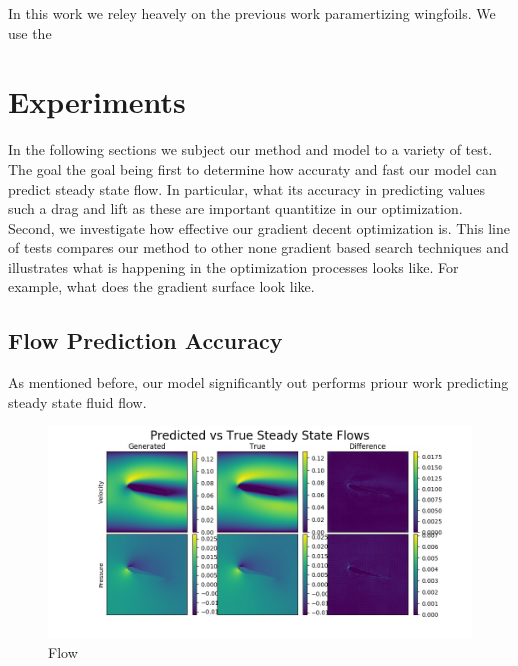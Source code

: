 \documentclass{article} %
\begin{document}
 In this work we reley heavely on the previous work paramertizing wingfoils. We use the 

\section{Experiments}

In the following sections we subject our method and model to a variety of test. The goal the goal being first to determine how accuraty and fast our model can predict steady state flow. In particular, what its accuracy in predicting values such a drag and lift as these are important quantitize in our optimization. Second, we investigate how effective our gradient decent optimization is. This line of tests compares our method to other none gradient based search techniques and illustrates what is happening in the optimization processes looks like. For example, what does the gradient surface look like.

\subsection{Flow Prediction Accuracy}

As mentioned before, our model significantly out performs priour work predicting steady state fluid flow. 

\begin{figure}[h]
\begin{center}
\includegraphics[scale=0.15]{../test/figs/generated_flow_difference.jpeg}
\end{center}
\caption{Flow}
\end{figure}
\end{document}
